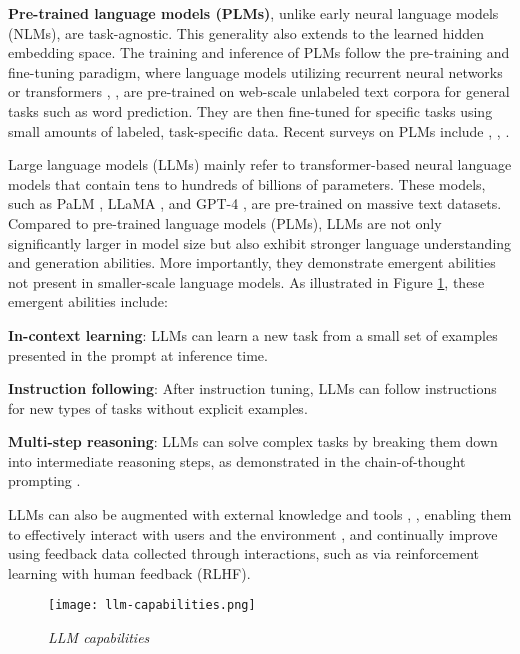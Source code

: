 \textbf{Pre-trained language models (PLMs)}, unlike early neural language models (NLMs), are task-agnostic. This generality also extends to the learned hidden embedding space. The training and inference of PLMs follow the pre-training and fine-tuning paradigm, where language models utilizing recurrent neural networks \cite{peters2018deep} or transformers \cite{devlin2019bert}, \cite{liu2019roberta}, \cite{he2021deberta} are pre-trained on web-scale unlabeled text corpora for general tasks such as word prediction. They are then fine-tuned for specific tasks using small amounts of labeled, task-specific data. Recent surveys on PLMs include \cite{zhou2023comprehensive}, \cite{han2021pretrained}, \cite{Qiu_2020}.

Large language models (LLMs) mainly refer to transformer-based neural language models that contain tens to hundreds of billions of parameters. These models, such as PaLM \cite{chowdhery2022palm}, LLaMA \cite{touvron2023llama}, and GPT-4 \cite{openai2024gpt4}, are pre-trained on massive text datasets. Compared to pre-trained language models (PLMs), LLMs are not only significantly larger in model size but also exhibit stronger language understanding and generation abilities. More importantly, they demonstrate emergent abilities not present in smaller-scale language models. As illustrated in Figure \ref{fig:llm-capabilities}, these emergent abilities include:

\textbf{In-context learning}: LLMs can learn a new task from a small set of examples presented in the prompt at inference time.

\textbf{Instruction following}: After instruction tuning, LLMs can follow instructions for new types of tasks without explicit examples.

\textbf{Multi-step reasoning}: LLMs can solve complex tasks by breaking them down into intermediate reasoning steps, as demonstrated in the chain-of-thought prompting \cite{wei2023chainofthought}.

LLMs can also be augmented with external knowledge and tools \cite{mialon2023augmented}, \cite{mialon2023augmented}, enabling them to effectively interact with users and the environment \cite{mialon2023augmented}, and continually improve using feedback data collected through interactions, such as via reinforcement learning with human feedback (RLHF).

\begin{figure}[H]
    \centering
    \texttt{[image: llm-capabilities.png]}
    \caption{
        \it{LLM capabilities \cite{minaee2024large}}
    }
    \label{fig:llm-capabilities}
\end{figure}